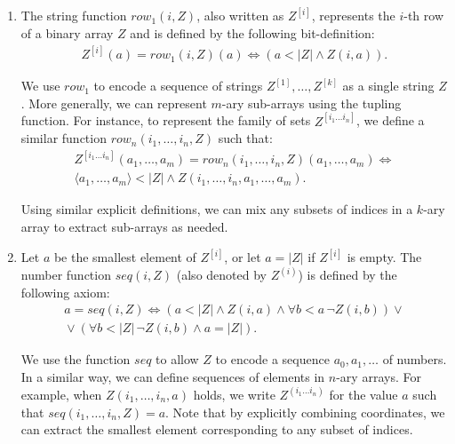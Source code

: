 \documentclass{article}
\theoremstyle{definition}
\theoremstyle{theorem}
\theoremstyle{theorem}
\theoremstyle{remark}
\theoremstyle{remark}
\theoremstyle{example}
\theoremstyle{notation}
\theoremstyle{theorem}
\begin{document}
\begin{enumerate}
\item The string function $row_1(i, Z)$, also written as $Z^{[i]}$, represents the $i$-th row of a binary array $Z$ and is defined by the following bit-definition:
\begin{equation}
\begin{gathered}
Z^{[i]}(a) = row_1(i, Z)(a) \iff (a<|Z|\wedge Z(i, a)).
\end{gathered}
\end{equation}

We use $row_1$ to encode a sequence of strings $Z^{[1]}, \ldots, Z^{[k]}$ as a single string $Z$. More generally, we can represent $m$-ary sub-arrays using the tupling function. For instance, to represent the family of sets $Z^{[i_1 \ldots i_n]}$, we define a similar function $row_n(i_1, \ldots, i_n, Z)$ such that:
\begin{equation}
\begin{gathered}
Z^{[i_1 \ldots i_n]}(a_1, \ldots, a_m) = row_n(i_1, \ldots, i_n, Z)(a_1, \ldots, a_m) \iff \\
\langle a_1, \ldots, a_m \rangle < |Z| \wedge Z(i_1, \ldots, i_n, a_1, \ldots, a_m).
\end{gathered}
\end{equation}

Using similar explicit definitions, we can mix any subsets of indices in a $k$-ary array to extract sub-arrays as needed.

\item Let $a$ be the smallest element of $Z^{[i]}$, or let $a = |Z|$ if $Z^{[i]}$ is empty. The number function $seq(i, Z)$ (also denoted by $Z^{(i)}$) is defined by the following axiom:
\begin{gather*}
a = seq(i, Z) \iff \left(a<|Z| \wedge Z(i, a) \wedge \forall b < a\, \neg Z(i, b) \right) \vee \\
\hspace{0pt} \vee \left( \forall b < |Z|\, \neg Z(i, b) \wedge a = |Z| \right).
\end{gather*}

We use the function $seq$ to allow $Z$ to encode a sequence $a_0, a_1, \ldots$ of numbers. In a similar way, we can define sequences of elements in $n$-ary arrays. For example, when $Z(i_1, \ldots, i_n, a)$ holds, we write $Z^{(i_1 \ldots i_n)}$ for the value $a$ such that $seq(i_1, \ldots, i_n, Z) = a$. Note that by explicitly combining coordinates, we can extract the smallest element corresponding to any subset of indices.
\end{enumerate}
\end{document}
